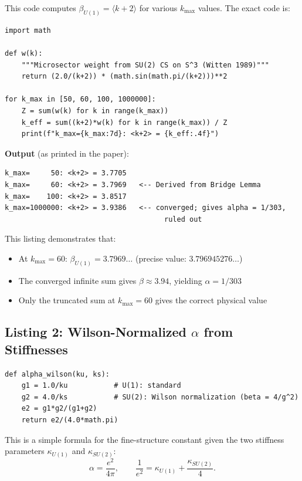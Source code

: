 \documentclass[11pt]{article}
\begin{document}
This code computes $\beta_{U(1)} = \langle k+2 \rangle$ for various
$k_{\max}$ values. The exact code is:

\begin{lstlisting}
import math

def w(k):
    """Microsector weight from SU(2) CS on S^3 (Witten 1989)"""
    return (2.0/(k+2)) * (math.sin(math.pi/(k+2)))**2

for k_max in [50, 60, 100, 1000000]:
    Z = sum(w(k) for k in range(k_max))
    k_eff = sum((k+2)*w(k) for k in range(k_max)) / Z
    print(f"k_max={k_max:7d}: <k+2> = {k_eff:.4f}")
\end{lstlisting}

\textbf{Output} (as printed in the paper):
\begin{verbatim}
k_max=     50: <k+2> = 3.7705
k_max=     60: <k+2> = 3.7969   <-- Derived from Bridge Lemma
k_max=    100: <k+2> = 3.8517
k_max=1000000: <k+2> = 3.9386   <-- converged; gives alpha = 1/303,
                                      ruled out
\end{verbatim}

This listing demonstrates that:
\begin{itemize}
\item At $k_{\max} = 60$: $\beta_{U(1)} = 3.7969\ldots$ (precise value: $3.796945276\ldots$)
\item The converged infinite sum gives $\beta \approx 3.94$, yielding $\alpha = 1/303$
\item Only the truncated sum at $k_{\max} = 60$ gives the correct physical value
\end{itemize}

\subsection{Listing 2: Wilson-Normalized $\alpha$ from Stiffnesses}

\begin{lstlisting}
def alpha_wilson(ku, ks):
    g1 = 1.0/ku           # U(1): standard
    g2 = 4.0/ks           # SU(2): Wilson normalization (beta = 4/g^2)
    e2 = g1*g2/(g1+g2)
    return e2/(4.0*math.pi)
\end{lstlisting}

This is a simple formula for the fine-structure constant given the two
stiffness parameters $\kappa_{U(1)}$ and $\kappa_{SU(2)}$:
\begin{equation}
\alpha = \frac{e^2}{4\pi}, \qquad
\frac{1}{e^2} = \kappa_{U(1)} + \frac{\kappa_{SU(2)}}{4}.
\end{equation}
\end{document}
